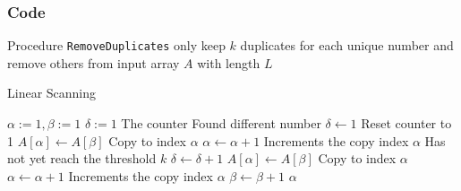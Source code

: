 \subsubsection{Code}
Procedure \texttt{RemoveDuplicates} only keep $k$ duplicates for each unique number and remove others from input array $A$ with length $L$
\setcounter{algorithm}{0}
\begin{algorithm}[H]
\caption{Linear Scanning}
\begin{algorithmic}[1]
\State $\alpha:=1, \beta:=1$ 
\State $\delta:=1$ \Comment The counter
 \Comment Found different number
\State $\delta \gets 1$ \Comment Reset counter to 1
\State $A[\alpha] \gets A[\beta]$ \Comment Copy to index $\alpha$
\State $\alpha \gets \alpha +1$ \Comment Increments the copy index $\alpha$
\Else
{} \Comment Has not yet reach the threshold $k$
\State $\delta\gets \delta +1$
\State $A[\alpha] \gets A[\beta]$ \Comment Copy to index $\alpha$
\State $\alpha \gets \alpha +1$ \Comment Increments the copy index $\alpha$
\EndIf
\EndIf
\State $\beta\gets \beta+1$
\EndWhile
\State \Return $\alpha$
\EndProcedure
\end{algorithmic}
\end{algorithm}

